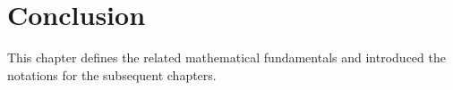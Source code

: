%
%
% 
%
%
%
%
%
%
%
%	
%	
%	
\section{Conclusion}
This chapter defines the related mathematical fundamentals and introduced the notations for the subsequent chapters.
	

